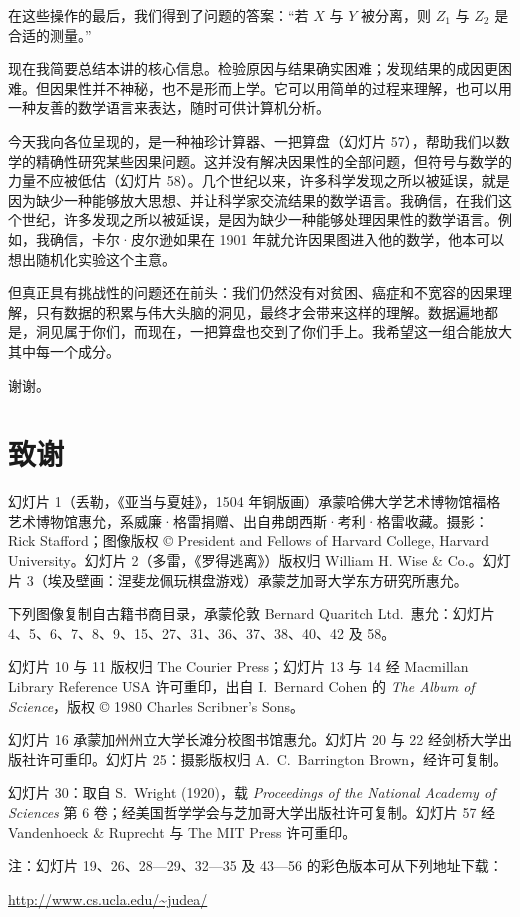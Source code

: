 \begin{center}
\end{center}

在这些操作的最后，我们得到了问题的答案：“若 $X$ 与 $Y$ 被分离，则 $Z_1$ 与 $Z_2$ 是合适的测量。”

现在我简要总结本讲的核心信息。检验原因与结果确实困难；发现结果的成因更困难。但因果性并不神秘，也不是形而上学。它可以用简单的过程来理解，也可以用一种友善的数学语言来表达，随时可供计算机分析。

今天我向各位呈现的，是一种袖珍计算器、一把算盘（幻灯片 57），帮助我们以数学的精确性研究某些因果问题。这并没有解决因果性的全部问题，但符号与数学的力量不应被低估（幻灯片 58）。几个世纪以来，许多科学发现之所以被延误，就是因为缺少一种能够放大思想、并让科学家交流结果的数学语言。我确信，在我们这个世纪，许多发现之所以被延误，是因为缺少一种能够处理因果性的数学语言。例如，我确信，卡尔·皮尔逊如果在 1901 年就允许因果图进入他的数学，他本可以想出随机化实验这个主意。

但真正具有挑战性的问题还在前头：我们仍然没有对贫困、癌症和不宽容的因果理解，只有数据的积累与伟大头脑的洞见，最终才会带来这样的理解。数据遍地都是，洞见属于你们，而现在，一把算盘也交到了你们手上。我希望这一组合能放大其中每一个成分。

谢谢。

\section*{致谢}

幻灯片 1（丢勒，《亚当与夏娃》，1504 年铜版画）承蒙哈佛大学艺术博物馆福格艺术博物馆惠允，系威廉·格雷捐赠、出自弗朗西斯·考利·格雷收藏。摄影：Rick Stafford；图像版权 © President and Fellows of Harvard College, Harvard University。幻灯片 2（多雷，《罗得逃离》）版权归 William H. Wise \& Co.。幻灯片 3（埃及壁画：涅斐龙佩玩棋盘游戏）承蒙芝加哥大学东方研究所惠允。

下列图像复制自古籍书商目录，承蒙伦敦 Bernard Quaritch Ltd.\ 惠允：幻灯片 4、5、6、7、8、9、15、27、31、36、37、38、40、42 及 58。

幻灯片 10 与 11 版权归 The Courier Press；幻灯片 13 与 14 经 Macmillan Library Reference USA 许可重印，出自 I.~Bernard Cohen 的 \textit{The Album of Science}，版权 © 1980 Charles Scribner's Sons。

幻灯片 16 承蒙加州州立大学长滩分校图书馆惠允。幻灯片 20 与 22 经剑桥大学出版社许可重印。幻灯片 25：摄影版权归 A.~C.~Barrington Brown，经许可复制。

幻灯片 30：取自 S.~Wright (1920)，载 \textit{Proceedings of the National Academy of Sciences} 第 6 卷；经美国哲学学会与芝加哥大学出版社许可复制。幻灯片 57 经 Vandenhoeck \& Ruprecht 与 The MIT Press 许可重印。

注：幻灯片 19、26、28—29、32—35 及 43—56 的彩色版本可从下列地址下载：
\begin{center}
\url{http://www.cs.ucla.edu/~judea/}
\end{center}
